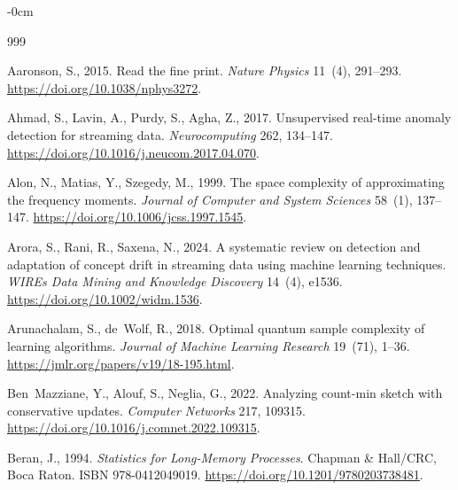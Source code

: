 \documentclass[sensors,article,submit,pdftex,moreauthors]{Definitions/mdpi}
\begin{document}


\begin{adjustwidth}{-\extralength}{0cm}
\begin{thebibliography}{999}

Aaronson, S., 2015.
\newblock Read the fine print.
\newblock \emph{Nature Physics} 11~(4), 291--293.
\newblock \url{https://doi.org/10.1038/nphys3272}.

Ahmad, S., Lavin, A., Purdy, S., Agha, Z., 2017.
\newblock Unsupervised real-time anomaly detection for streaming data.
\newblock \emph{Neurocomputing} 262, 134--147.
\newblock \url{https://doi.org/10.1016/j.neucom.2017.04.070}.

Alon, N., Matias, Y., Szegedy, M., 1999.
\newblock The space complexity of approximating the frequency moments.
\newblock \emph{Journal of Computer and System Sciences} 58~(1), 137--147.
\newblock \url{https://doi.org/10.1006/jcss.1997.1545}.

Arora, S., Rani, R., Saxena, N., 2024.
\newblock A systematic review on detection and adaptation of concept drift in streaming data using machine learning techniques.
\newblock \emph{WIREs Data Mining and Knowledge Discovery} 14~(4), e1536.
\newblock \url{https://doi.org/10.1002/widm.1536}.

Arunachalam, S., de~Wolf, R., 2018.
\newblock Optimal quantum sample complexity of learning algorithms.
\newblock \emph{Journal of Machine Learning Research} 19~(71), 1--36.
\newblock \url{https://jmlr.org/papers/v19/18-195.html}.

Ben~Mazziane, Y., Alouf, S., Neglia, G., 2022.
\newblock Analyzing count-min sketch with conservative updates.
\newblock \emph{Computer Networks} 217, 109315.
\newblock \url{https://doi.org/10.1016/j.comnet.2022.109315}.

Beran, J., 1994.
\newblock \emph{Statistics for Long-Memory Processes}.
\newblock Chapman \& Hall/CRC, Boca Raton. ISBN 978-0412049019.
\newblock \url{https://doi.org/10.1201/9780203738481}.


\end{thebibliography}
\end{adjustwidth}
\end{document}
